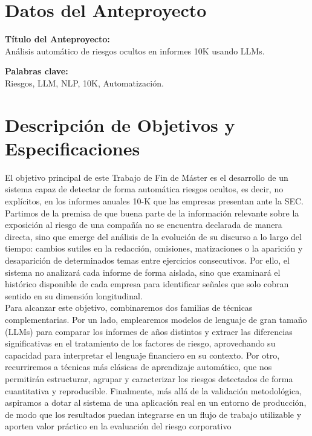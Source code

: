 \documentclass[spanish,a4paper,12pt]{article}
\begin{document}
\section*{Datos del Anteproyecto}

\textbf{Título del Anteproyecto:} \\ Análisis automático de riesgos ocultos en informes 10K usando LLMs.

\vspace{0.0cm}
\textbf{Palabras clave:} \\ Riesgos, LLM, NLP, 10K, Automatización.

\newpage

\vspace{0.1cm}

\section*{Descripción de Objetivos y Especificaciones}
El objetivo principal de este Trabajo de Fin de Máster es el desarrollo de un sistema capaz de detectar de forma automática riesgos ocultos, es decir, no explícitos, en los informes anuales 10-K que las empresas presentan ante la SEC. Partimos de la premisa de que buena parte de la información relevante sobre la exposición al riesgo de una compañía no se encuentra declarada de manera directa, sino que emerge del análisis de la evolución de su discurso a lo largo del tiempo: cambios sutiles en la redacción, omisiones, matizaciones o la aparición y desaparición de determinados temas entre ejercicios consecutivos. Por ello, el sistema no analizará cada informe de forma aislada, sino que examinará el histórico disponible de cada empresa para identificar señales que solo cobran sentido en su dimensión longitudinal. \\


Para alcanzar este objetivo, combinaremos dos familias de técnicas complementarias. Por un lado, emplearemos modelos de lenguaje de gran tamaño (LLMs) para comparar los informes de años distintos y extraer las diferencias significativas en el tratamiento de los factores de riesgo, aprovechando su capacidad para interpretar el lenguaje financiero en su contexto. Por otro, recurriremos a técnicas más clásicas de aprendizaje automático, que nos permitirán estructurar, agrupar y caracterizar los riesgos detectados de forma cuantitativa y reproducible. Finalmente, más allá de la validación metodológica, aspiramos a dotar al sistema de una aplicación real en un entorno de producción, de modo que los resultados puedan integrarse en un flujo de trabajo utilizable y aporten valor práctico en la evaluación del riesgo corporativo
\end{document}
